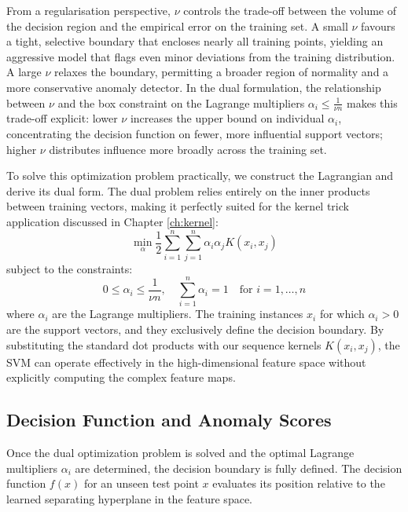 From a regularisation perspective, $\nu$ controls the trade-off between the volume of the decision region and the empirical error on the training set. A small $\nu$ favours a tight, selective boundary that encloses nearly all training points, yielding an aggressive model that flags even minor deviations from the training distribution. A large $\nu$ relaxes the boundary, permitting a broader region of normality and a more conservative anomaly detector. In the dual formulation, the relationship between $\nu$ and the box constraint on the Lagrange multipliers $\alpha_i \leq \frac{1}{\nu n}$ makes this trade-off explicit: lower $\nu$ increases the upper bound on individual $\alpha_i$, concentrating the decision function on fewer, more influential support vectors; higher $\nu$ distributes influence more broadly across the training set.

To solve this optimization problem practically, we construct the Lagrangian and derive its dual form. 
The dual problem relies entirely on the inner products between training vectors, making it perfectly suited for the kernel trick application discussed in Chapter \ref{ch:kernel}:
\begin{equation}\label{eq:ocsvm-dual}
\min_{\alpha} \frac{1}{2} \sum_{i=1}^n \sum_{j=1}^n \alpha_i \alpha_j K(x_i, x_j)
\end{equation}
subject to the constraints:
\begin{equation}\label{eq:ocsvm-dual-constraints}
0 \leq \alpha_i \leq \frac{1}{\nu n}, \quad \sum_{i=1}^n \alpha_i = 1 \quad \text{for } i = 1, \ldots, n
\end{equation}
where $\alpha_i$ are the Lagrange multipliers. The training instances $x_i$ for which $\alpha_i > 0$ are the support vectors, and they exclusively define the decision boundary. By substituting the standard dot products with our sequence kernels $K(x_i, x_j)$, the SVM can operate effectively in the high-dimensional feature space without explicitly computing the complex feature maps.

\subsection{Decision Function and Anomaly Scores}\label{sec:decision-function}

Once the dual optimization problem is solved and the optimal Lagrange multipliers $\alpha_i$ are determined, the decision boundary is fully defined. The decision function $f(x)$ for an unseen test point $x$ evaluates its position relative to the learned separating hyperplane in the feature space.

